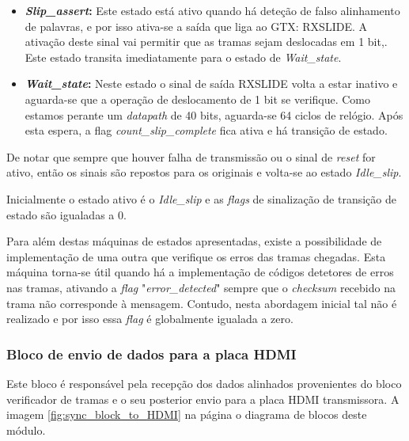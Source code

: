 \begin{enumerate}
\begin{itemize}
		\item \textbf{\textit{Slip\_assert}:} Este estado está ativo quando há deteção de falso alinhamento de palavras, e por isso ativa-se a saída que liga ao GTX: RXSLIDE. A ativação deste sinal vai permitir que as tramas sejam deslocadas em 1 bit,. Este estado transita imediatamente para o estado de \textit{Wait\_state}.
		
		\item \textbf{\textit{Wait\_state}:} Neste estado o sinal de saída RXSLIDE volta a estar inativo e aguarda-se que a operação de deslocamento de 1 bit se verifique. Como estamos perante um \textit{datapath} de 40 bits, aguarda-se 64 ciclos de relógio. Após esta espera, a flag \textit{count\_slip\_complete} fica ativa e há transição de estado.
	\end{itemize}
	
	De notar que sempre que houver falha de transmissão ou o sinal de \textit{reset} for ativo, então os sinais são repostos para os originais e volta-se ao estado \textit{Idle\_slip}.
	
	
	Inicialmente o estado ativo é o {\textit{Idle\_slip} }e as \textit{flags} de sinalização de transição de estado são igualadas a 0.
	
\end{enumerate}

Para além destas máquinas de estados apresentadas, existe a possibilidade de implementação de uma outra que verifique os erros das tramas chegadas. Esta máquina torna-se útil quando há a implementação de códigos detetores de erros nas tramas, ativando a \textit{flag}  "\textit{error\_detected}" sempre que o \textit{checksum} recebido na trama não corresponde à mensagem. Contudo, nesta abordagem inicial tal não é realizado e por isso essa \textit{flag} é globalmente igualada a zero.
  
\subsubsection*{Bloco de envio de dados para a placa HDMI} \label{subsub:serial_send signals to HDMI}

Este bloco é responsável pela recepção dos dados alinhados provenientes do bloco verificador de tramas e o seu posterior envio para a placa HDMI transmissora. A imagem \ref{fig:sync_block_to_HDMI} na página \pageref{fig:sync_block_to_HDMI} o diagrama de blocos deste módulo.

